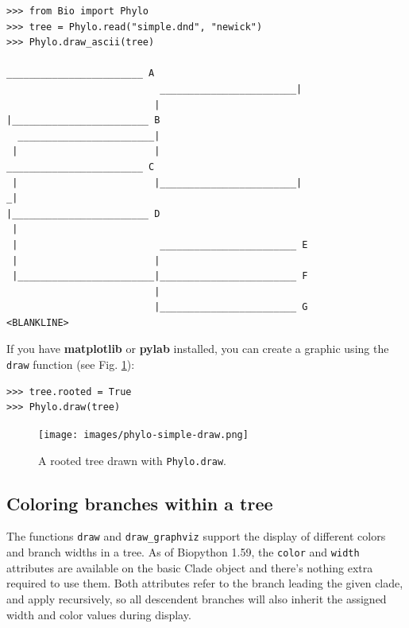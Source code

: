 \documentclass{report}
\begin{document}
\begin{verbatim}
>>> from Bio import Phylo
>>> tree = Phylo.read("simple.dnd", "newick")
>>> Phylo.draw_ascii(tree)
                                                    ________________________ A
                           ________________________|
                          |                        |________________________ B
  ________________________|
 |                        |                         ________________________ C
 |                        |________________________|
_|                                                 |________________________ D
 |
 |                         ________________________ E
 |                        |
 |________________________|________________________ F
                          |
                          |________________________ G
<BLANKLINE>
\end{verbatim}

If you have \textbf{matplotlib} or \textbf{pylab} installed, you can create a graphic
using the \verb|draw| function (see Fig. \ref{fig:phylo-simple-draw}):

\begin{verbatim}
>>> tree.rooted = True
>>> Phylo.draw(tree)
\end{verbatim}

\begin{htmlonly}
\label{fig:phylo-simple-draw}
\end{htmlonly}

\begin{latexonly}
\begin{figure}[htb]
\centering
\texttt{[image: images/phylo-simple-draw.png]}
\caption{A rooted tree drawn with {\tt Phylo.draw}.}
\label{fig:phylo-simple-draw}
\end{figure}
\end{latexonly}


\subsection{Coloring branches within a tree}

The functions \verb|draw| and \verb|draw_graphviz| support the display of different
colors and branch widths in a tree.
As of Biopython 1.59, the \verb|color| and \verb|width| attributes are available on the
basic Clade object and there's nothing extra required to use them.
Both attributes refer to the branch leading the given clade, and apply recursively, so
all descendent branches will also inherit the assigned width and color values during
display.
\end{document}
